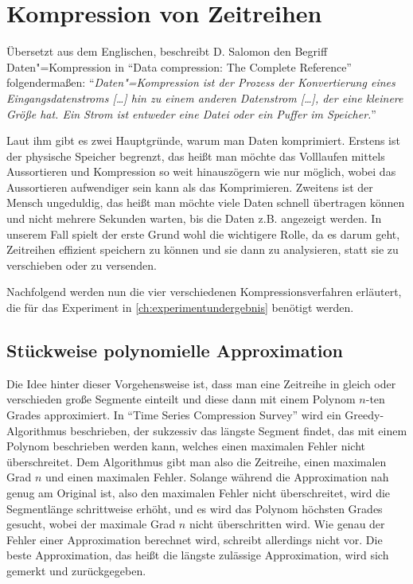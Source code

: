 \section{Kompression von Zeitreihen}
Übersetzt aus dem Englischen, beschreibt D. Salomon den Begriff Daten"=Kompression in "`Data compression: The Complete Reference"' \cite[p. 1-2]{dataCompressionSalmon} folgendermaßen: "`\textit{Daten"=Kompression ist der Prozess der Konvertierung eines Eingangsdatenstroms [\ldots] hin zu einem anderen Datenstrom [\ldots], der eine kleinere Größe hat. Ein Strom ist entweder eine Datei oder ein Puffer im Speicher.}"'

Laut ihm gibt es zwei Hauptgründe, warum man Daten komprimiert. Erstens ist der physische Speicher begrenzt, das heißt man möchte das Volllaufen mittels Aussortieren und Kompression so weit hinauszögern wie nur möglich, wobei das Aussortieren aufwendiger sein kann als das Komprimieren. Zweitens ist der Mensch ungeduldig, das heißt man möchte viele Daten schnell übertragen können und nicht mehrere Sekunden warten, bis die Daten z.B. angezeigt werden. In unserem Fall spielt der erste Grund wohl die wichtigere Rolle, da es darum geht, Zeitreihen effizient speichern zu können und sie dann zu analysieren, statt sie zu verschieben oder zu versenden.

Nachfolgend werden nun die vier verschiedenen Kompressionsverfahren erläutert, die für das Experiment in \autoref{ch:experimentundergebnis} benötigt werden.

\subsection{Stückweise polynomielle Approximation}\label{subsec:ppa}
Die Idee hinter dieser Vorgehensweise ist, dass man eine Zeitreihe in gleich oder verschieden große Segmente einteilt und diese dann mit einem Polynom $n$-ten Grades approximiert. In "`Time Series Compression Survey"' \cite[Ch. 4.2.1]{compressionSurvey} wird ein Greedy-Algorithmus beschrieben, der sukzessiv das längste Segment findet, das mit einem Polynom beschrieben werden kann, welches einen maximalen Fehler nicht überschreitet. Dem Algorithmus gibt man also die Zeitreihe, einen maximalen Grad $n$ und einen maximalen Fehler. Solange während die Approximation nah genug am Original ist, also den maximalen Fehler nicht überschreitet, wird die Segmentlänge schrittweise erhöht, und es wird das Polynom höchsten Grades gesucht, wobei der maximale Grad $n$ nicht überschritten wird. Wie genau der Fehler einer Approximation berechnet wird, schreibt \cite[Algorithm 4]{compressionSurvey} allerdings nicht vor. Die beste Approximation, das heißt die längste zulässige Approximation, wird sich gemerkt und zurückgegeben.

